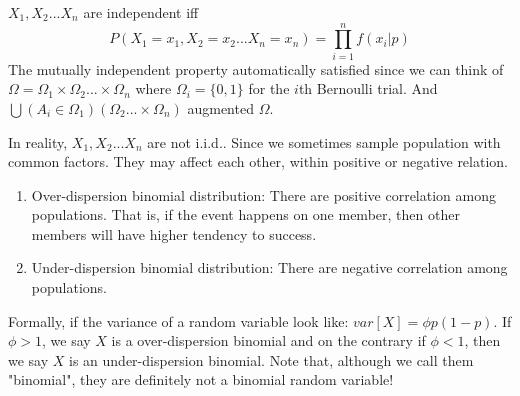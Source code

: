 \documentclass[../Distributions.tex]{subfiles}
\begin{document}
\begin{intuition}[Independent]
$X_1,X_2...X_n$ are independent iff $$P(X_1=x_1,X_2=x_2...X_n=x_n)=\prod_{i=1}^nf(x_i|p)$$
The mutually independent property automatically satisfied since we can think of $\Omega=\Omega_1\times\Omega_2...\times\Omega_n$ where $\Omega_i=\{0,1\}$ for the $i$th Bernoulli trial. And $\bigcup(A_i\in\Omega_1)(\Omega_2...\times\Omega_n)$ augmented $\Omega$.
\end{intuition}
\begin{remark}In reality, $X_1,X_2...X_n$ are not i.i.d.. Since we sometimes sample population with common factors. They may affect each other, within positive or negative relation.
\begin{enumerate}
\item Over-dispersion binomial distribution: There are positive correlation among populations. That is, if the event happens on one member, then other members will have higher tendency to success.
\item Under-dispersion binomial distribution: There are negative correlation among populations.
\end{enumerate}
Formally, if the variance of a random variable look like: $var[X]=\phi p(1-p)$. If $\phi > 1$, we say $X$ is a over-dispersion binomial and on the contrary if $\phi<1$, then we say $X$ is an under-dispersion binomial. Note that, although we call them "binomial", they are definitely not a binomial random variable!

\end{remark}
\end{document}
